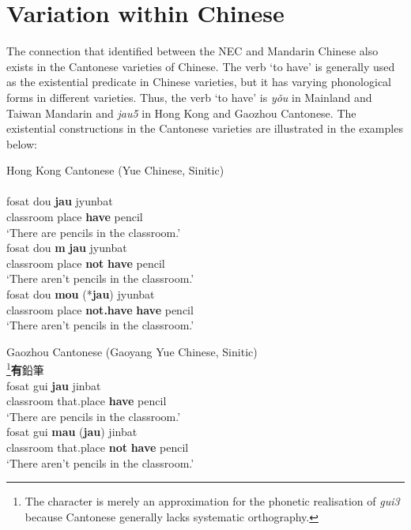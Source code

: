 \documentclass[output=paper,colorlinks,citecolor=brown,chinesefont]{langscibook}
\begin{document}
\section{Variation within Chinese}\label{s:lam5}

The connection that \citeauthor{Croft1991} identified between the NEC and Mandarin Chinese also exists in the Cantonese varieties of Chinese. The verb `to have' is generally used as the existential predicate in Chinese varieties, but it has varying phonological forms in different varieties. Thus, the verb `to have' is \textit{yǒu} in Mainland and Taiwan Mandarin and \textit{jau5} in Hong Kong and Gaozhou Cantonese. The existential constructions in the Cantonese varieties are illustrated in the examples below: 


\ea Hong Kong Cantonese (Yue Chinese, Sinitic) \label{ex:lam27}\\
  \label{ex:lam27a}\\
  	\gll fosat	dou	\textbf{jau} jyunbat\\
  	classroom place	\textbf{have} pencil\\
  	\glt `There are pencils in the classroom.'
  \label{ex:lam27b}\\
  	\gll *fosat	dou	\textbf{m} \textbf{jau} jyunbat\\
  	classroom place	\textbf{not} \textbf{have} pencil\\
  	\glt `There aren't pencils in the classroom.'
  \label{ex:lam27c}\\
  	\gll fosat	dou	\textbf{mou} (*\textbf{jau}) jyunbat\\
  	classroom	place	\textbf{not.have}	\textbf{have}	pencil\\
  	\glt `There aren't pencils in the classroom.'
\z \z
 
\ea Gaozhou Cantonese (Gaoyang Yue Chinese, Sinitic) \label{ex:lam28}\\
  \footnote{The character is merely an approximation for the phonetic realisation of \textit{gui3} because Cantonese generally lacks systematic orthography.}{\cn \textbf{有}鉛筆} \label{ex:lam28a}\\
  	\gll fosat gui \textbf{jau} jinbat\\	
  	classroom that.place \textbf{have} pencil\\
  	\glt `There are pencils in the classroom.'
   \label{ex:lam28b}\\
  	\gll fosat gui \textbf{mau} (\textbf{jau}) jinbat\\
  	classroom that.place \textbf{not} \textbf{have} pencil\\
  	\glt `There aren't pencils in the classroom.'
\z \z
\end{document}
